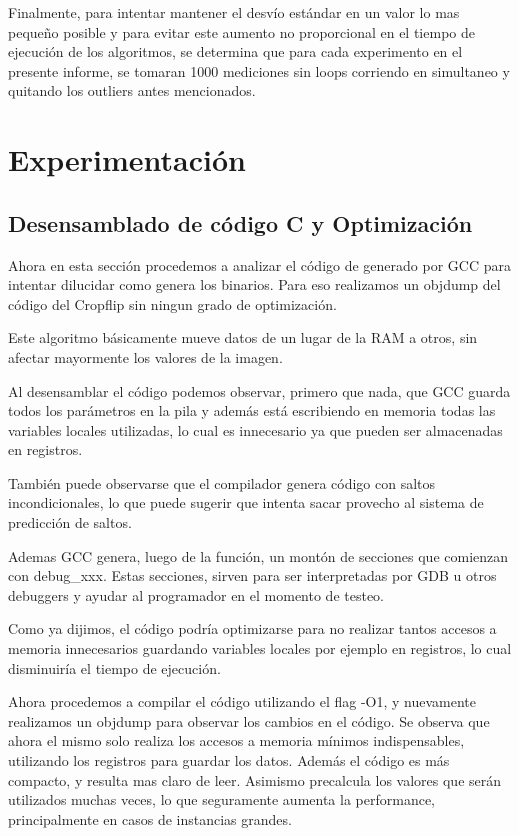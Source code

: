 \documentclass[a4paper]{article}
\begin{document}
Finalmente, para intentar mantener el desvío estándar en un valor lo mas pequeño posible y para evitar este aumento no proporcional en el tiempo de ejecución de los algoritmos, se determina que para cada experimento en el presente informe, se tomaran 1000 mediciones sin loops corriendo en simultaneo y quitando los outliers antes mencionados.

\newpage

\section{Experimentación}

\subsection{Desensamblado de código C y Optimización}

Ahora en esta sección procedemos a analizar el código de generado por GCC para intentar dilucidar como genera los binarios. Para eso realizamos un objdump del código del Cropflip sin ningun grado de optimización.

Este algoritmo básicamente mueve datos de un lugar de la RAM a otros, sin afectar mayormente los valores de la imagen.

Al desensamblar el código podemos observar, primero que nada, que GCC guarda todos los parámetros en la pila y además está escribiendo en memoria todas las variables locales utilizadas, lo cual es innecesario ya que pueden ser almacenadas en registros.

También puede observarse que el compilador genera código con saltos incondicionales, lo que puede sugerir que intenta sacar provecho al sistema de predicción de saltos.

Ademas GCC genera, luego de la función, un montón de secciones que comienzan con debug_xxx. Estas secciones, sirven para ser interpretadas por GDB u otros debuggers y ayudar al programador en el momento de testeo.

Como ya dijimos, el código podría optimizarse para no realizar tantos accesos a memoria innecesarios guardando variables locales por ejemplo en registros, lo cual disminuiría el tiempo de ejecución.

Ahora procedemos a compilar el código utilizando el flag -O1, y nuevamente realizamos un objdump para observar los cambios en el código. Se observa que ahora el mismo solo realiza los accesos a memoria mínimos indispensables, utilizando los registros para guardar los datos. Además el código es más compacto, y resulta mas claro de leer. Asimismo precalcula los valores que serán utilizados muchas veces, lo que seguramente aumenta la performance, principalmente en casos de instancias grandes.
\end{document}
